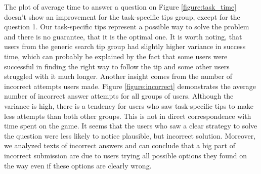 \documentclass{sig-alternate}
\begin{document}
The plot of average time to answer a question on Figure \ref{figure:task_time} doesn't show an improvement for the task-specific tips group, except for the question 1.
Our task-specific tips represent a possible way to solve the problem and there is no guarantee, that it is the optimal one.
It is worth noting, that users from the generic search tip group had slightly higher variance in success time, which can probably be explained by the fact that some users were successful in finding the right way to follow the tip and some other users struggled with it much longer.
Another insight comes from the number of incorrect attempts users made.
Figure \ref{figure:incorrect} demonstrates the average number of incorrect answer attempts for all groups of users.
Although the variance is high, there is a tendency for users who saw task-specific tips to make less attempts than both other groups.
This is not in direct correspondence with time spent on the game.
It seems that the users who saw a clear strategy to solve the question were less likely to notice plausible, but incorrect solution.
Moreover, we analyzed texts of incorrect answers and can conclude that a big part of incorrect submission are due to users trying all possible options they found on the way even if these options are clearly wrong.
\end{document}
